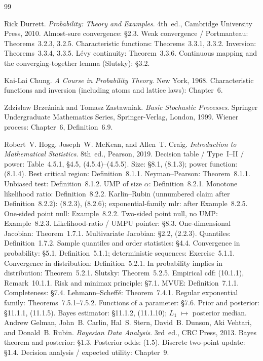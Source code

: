 \documentclass[11pt,a4paper]{article}
\begin{document}
\begin{thebibliography}{99}

Rick Durrett.
\newblock \emph{Probability: Theory and Examples}.
\newblock 4th~ed., Cambridge University Press, 2010.
\newblock Almost-sure convergence: \S2.3. Weak convergence / Portmanteau: Theorems~3.2.3, 3.2.5. Characteristic functions: Theorems~3.3.1, 3.3.2. Inversion: Theorems~3.3.4, 3.3.5. L\'evy continuity: Theorem~3.3.6. Continuous mapping and the converging-together lemma (Slutsky): \S3.2.

Kai-Lai Chung.
\newblock \emph{A Course in Probability Theory}.
\newblock New York, 1968.
\newblock Characteristic functions and inversion (including atoms and lattice laws): Chapter~6.

Zdzis\l{}aw Brze\'zniak and Tomasz Zastawniak.
\newblock \emph{Basic Stochastic Processes}.
\newblock Springer Undergraduate Mathematics Series, Springer-Verlag, London, 1999.
\newblock Wiener process: Chapter~6, Definition~6.9.

Robert~V. Hogg, Joseph~W. McKean, and Allen~T. Craig.
\newblock \emph{Introduction to Mathematical Statistics}.
\newblock 8th~ed., Pearson, 2019.
\newblock Decision table / Type~I--II / power: Table~4.5.1, \S4.5, (4.5.4)--(4.5.5). Size: \S8.1, (8.1.3); power function: (8.1.4). Best critical region: Definition~8.1.1. Neyman--Pearson: Theorem~8.1.1. Unbiased test: Definition~8.1.2. UMP of size \(\alpha\): Definition~8.2.1. Monotone likelihood ratio: Definition~8.2.2. Karlin--Rubin (unnumbered claim after Definition~8.2.2): (8.2.3), (8.2.6); exponential-family mlr: after Example~8.2.5. One-sided point null: Example~8.2.2. Two-sided point null, no UMP: Example~8.2.3. Likelihood-ratio / UMPU pointer: \S8.3. One-dimensional Jacobian: Theorem~1.7.1. Multivariate Jacobian: \S2.2, (2.2.3). Quantiles: Definition~1.7.2. Sample quantiles and order statistics: \S4.4. Convergence in probability: \S5.1, Definition~5.1.1; deterministic sequences: Exercise~5.1.1. Convergence in distribution: Definition~5.2.1. In probability implies in distribution: Theorem~5.2.1. Slutsky: Theorem~5.2.5. Empirical cdf: (10.1.1), Remark~10.1.1. Risk and minimax principle: \S7.1. MVUE: Definition~7.1.1. Completeness: \S7.4. Lehmann--Scheff\'e: Theorem~7.4.1. Regular exponential family: Theorems~7.5.1--7.5.2. Functions of a parameter: \S7.6. Prior and posterior: \S11.1.1, (11.1.5). Bayes estimator: \S11.1.2, (11.1.10); \(L_1\) \(\mapsto\) posterior median.
Andrew Gelman, John~B. Carlin, Hal~S. Stern, David~B. Dunson, Aki Vehtari, and Donald~B. Rubin.
\newblock \emph{Bayesian Data Analysis}.
\newblock 3rd~ed., CRC Press, 2013.
\newblock Bayes theorem and posterior: \S1.3. Posterior odds: (1.5). Discrete two-point update: \S1.4. Decision analysis / expected utility: Chapter~9.


\end{thebibliography}
\end{document}
